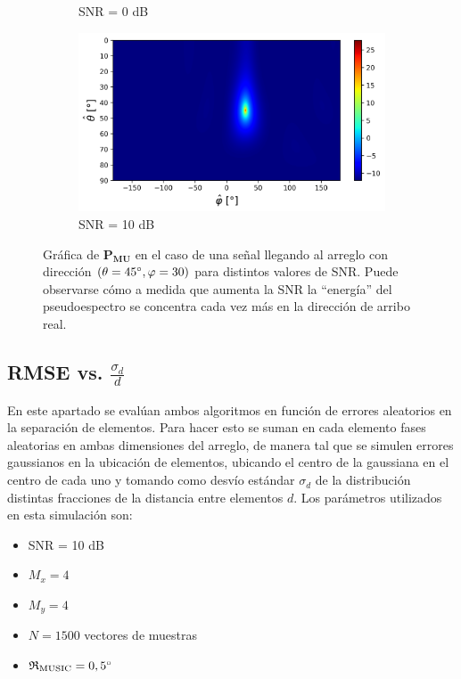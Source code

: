 \begin{figure}[ht!]
\begin{subfigure}[b]{0.49\textwidth}
        \caption{SNR = 0 dB}
    \end{subfigure}
    \hfill
    \begin{subfigure}[b]{0.49\textwidth}
        \centering
        \includegraphics[width=\linewidth]{images/03-DOAEst/p_mu_10.png}
        \caption{SNR = 10 dB}
    \end{subfigure}
    \caption{Gráfica de $\mathbf{P_{MU}}$ en el caso de una señal llegando al arreglo con dirección $(\theta = 45^{\circ}, \varphi=30)$ para distintos valores de SNR. Puede observarse cómo a medida que aumenta la SNR la ``energía'' del pseudoespectro se concentra cada vez más en la dirección de arribo real.}
    \label{fig:doaest_p_mu}
\end{figure}

\subsection{RMSE vs. $\frac{\sigma_d}{d}$}

En este apartado se evalúan ambos algoritmos en función de errores aleatorios en la separación de elementos. Para hacer esto se suman en cada elemento fases aleatorias en ambas dimensiones del arreglo, de manera tal que se simulen errores gaussianos en la ubicación de elementos, ubicando el centro de la gaussiana en el centro de cada uno y tomando como desvío estándar $\sigma_d$ de la distribución distintas fracciones de la distancia entre elementos $d$.
Los parámetros utilizados en esta simulación son:
\begin{itemize}
    \item SNR = 10 dB
    \item $M_x = 4$
    \item $M_y = 4$
    \item $N = 1500$ vectores de muestras
    \item $\mathfrak{R}_{\textrm{MUSIC}}=0,5^{\circ}$
\end{itemize}

